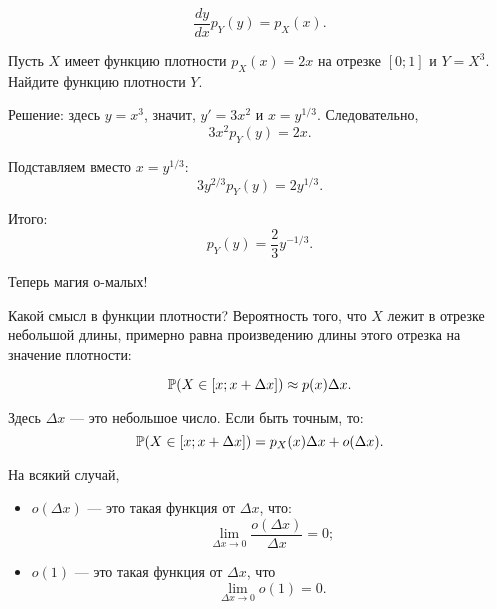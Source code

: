 \begin{equation}
\frac{dy}{dx}p_{Y}(y)=p_{X}(x).
\end{equation}

\begin{myex} Пусть $ X $ имеет функцию плотности $ p_{X}(x)=2x $ на отрезке $ [0;1] $ и $ Y=X^{3} $. Найдите функцию плотности $ Y $.

Решение: здесь $ y=x^{3} $, значит, $ y'=3x^{2} $ и $ x=y^{1/3} $. Следовательно,
\begin{equation}
3x^{2}p_{Y}(y)=2x.
\end{equation}

Подставляем вместо $ x=y^{1/3} $:
\begin{equation}
3y^{2/3}p_{Y}(y)=2y^{1/3}.
\end{equation}

Итого:
\begin{equation}
p_{Y}(y)=\frac{2}{3}y^{-1/3}.
\end{equation}
\end{myex}

Теперь магия о-малых!

Какой смысл в функции плотности? Вероятность того, что $ X $ лежит в отрезке небольшой длины, примерно равна произведению длины этого отрезка на значение плотности:

\begin{equation}
\P(X\in [x;x+\Delta x])\approx p(x)\Delta x.
\end{equation}

Здесь $ \Delta x $ — это небольшое число. Если быть точным, то:
\begin{equation}
\P(X\in [x;x+\Delta x])=p_{X}(x)\Delta x+o(\Delta x).
\end{equation}


На всякий случай,
\begin{itemize}
\item $ o(\Delta x) $ — это такая функция от $ \Delta x $, что:
\begin{equation}
\lim_{\Delta x\to 0} \frac{o(\Delta x)}{\Delta x}=0;
\end{equation}
\item $ o(1) $ — это такая функция от $ \Delta x $, что
\begin{equation}
\lim_{\Delta x \to 0} o(1)=0.
\end{equation}


\end{itemize}



